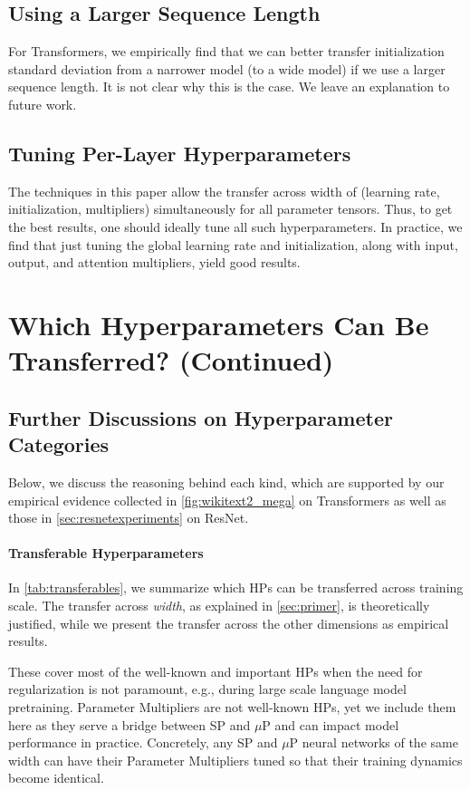 \documentclass{article}
\theoremstyle{definition}
\begin{document}
\subsection{Using a Larger Sequence Length}

For Transformers, we empirically find that we can better transfer initialization standard deviation from a narrower model (to a wide model) if we use a larger sequence length.
It is not clear why this is the case.
We leave an explanation to future work.

\subsection{Tuning Per-Layer Hyperparameters}
The techniques in this paper allow the transfer across width of (learning rate, initialization, multipliers) simultaneously for all parameter tensors.
Thus, to get the best results, one should ideally tune all such hyperparameters.
In practice, we find that just tuning the global learning rate and initialization, along with input, output, and attention multipliers, yield good results.

\section{Which Hyperparameters Can Be Transferred? (Continued)}

\subsection{Further Discussions on Hyperparameter Categories}
\label{sec:hypdiscussions}

Below, we discuss the reasoning behind each kind, which are supported by our empirical evidence collected in \cref{fig:wikitext2_mega} on Transformers as well as those in \cref{sec:resnetexperiments} on ResNet.

\paragraph{Transferable Hyperparameters}
\label{sec:transferable}

In \cref{tab:transferables}, we summarize which HPs can be transferred across training scale.
The transfer across \emph{width}, as explained in \cref{sec:primer}, is theoretically justified, while we present the transfer across the other dimensions as empirical results.

These cover most of the well-known and important HPs when the need for regularization is not paramount, e.g., during large scale language model pretraining.
{Parameter Multipliers} are not well-known HPs, yet we include them here as they serve a bridge between SP and $\mu$P and can impact model performance in practice.
Concretely, any SP and $\mu$P neural networks of the same width can have their Parameter Multipliers tuned so that their training dynamics become identical.
\end{document}
